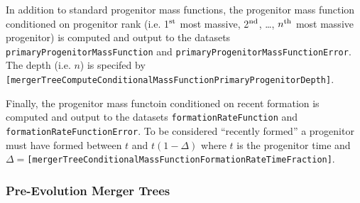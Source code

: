 In addition to standard progenitor mass functions, the progenitor mass function conditioned on progenitor rank (i.e. 1$^{\rm st}$ most massive, 2$^{\rm nd}$, \ldots, $n^{\rm th}$ most massive progenitor) is computed and output to the datasets {\tt primaryProgenitorMassFunction} and {\tt primaryProgenitorMassFunctionError}. The depth (i.e. $n$) is specifed by {\tt [mergerTreeComputeConditionalMassFunctionPrimaryProgenitorDepth]}.

Finally, the progenitor mass functoin conditioned on recent formation is computed and output to the datasets {\tt formationRateFunction} and {\tt formationRateFunctionError}. To be considered ``recently formed'' a progenitor must have formed between $t$ and $t(1-\Delta)$ where $t$ is the progenitor time and $\Delta=${\tt [mergerTreeConditionalMassFunctionFormationRateTimeFraction]}.

\subsubsection{Pre-Evolution Merger Trees}

